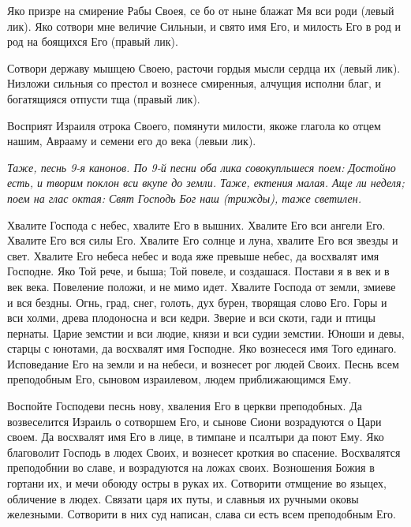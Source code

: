 Яко призре на смирение Рабы Своея, се бо от ныне блажат Мя вси роди (левый лик). Яко сотвори мне величие Сильныи, и свято имя Его, и милость Его в род и род на боящихся Его (правый лик). 

Сотвори державу мышцею Своею, расточи гордыя мысли сердца их (левый лик). Низложи сильныя со престол и вознесе смиренныя, алчущия исполни благ, и богатящияся отпусти тща (правый лик). 

Восприят Израиля отрока Своего, помянути милости, якоже глагола ко отцем нашим, Аврааму и семени его до века (левыи лик).


\itshape Таже, песнь 9-я канонов. По 9-й песни оба лика совокупльшеся поем:\normalfont{} Достойно есть, и творим поклон вси вкупе до земли. Таже, ектения малая. Аще ли неделя; поем на глас октая: Свят Господь Бог наш (трижды), таже светилен.




Хвалите Господа с небес, хвалите Его в вышних. Хвалите Его вси ангели Его. Хвалите Его вся силы Его. Хвалите Его солнце и луна, хвалите Его вся звезды и свет. Хвалите Его небеса небес и вода яже превыше небес, да восхвалят имя Господне. Яко Той рече, и быша; Той повеле, и создашася. Постави я в век и в век века. Повеление положи, и не мимо идет. Хвалите Господа от земли, змиеве и вся бездны. Огнь, град, снег, голоть, дух бурен, творящая слово Его. Горы и вси холми, древа плодоносна и вси кедри. Зверие и вси скоти, гади и птицы пернаты. Царие земстии и вси людие, князи и вси судии земстии. Юноши и девы, старцы с юнотами, да восхвалят имя Господне. Яко вознесеся имя Того единаго. Исповедание Его на земли и на небеси, и вознесет рог людей Своих. Песнь всем преподобным Его, сыновом израилевом, людем приближающимся Ему.




Воспойте Господеви песнь нову, хваления Его в церкви преподобных. Да возвеселится Израиль о сотворшем Его, и сынове Сиони возрадуются о Цари своем. Да восхвалят имя Его в лице, в тимпане и псалтыри да поют Ему. Яко благоволит Господь в людех Своих, и вознесет кроткия во спасение. Восхвалятся преподобнии во славе, и возрадуются на ложах своих. Возношения Божия в гортани их, и мечи обоюду остры в руках их. Сотворити отмщение во языцех, обличение в людех. Связати царя их путы, и славныя их ручными оковы железными. Сотворити в них суд написан, слава си есть всем преподобным Его.




